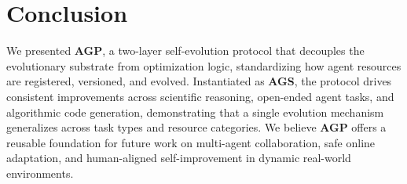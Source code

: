 \documentclass{article}
\theoremstyle{plain}
\theoremstyle{definition}
\theoremstyle{remark}
\newcommand{\projectname}{\textbf{\textsc{AGP}}\xspace}
\newcommand{\projectnameAgent}{\textbf{\textsc{AGS}}\xspace}
\begin{document}
\vspace{-0.2cm}
\section{Conclusion}
\vspace{-0.2cm}

We presented \projectname, a two-layer self-evolution protocol that decouples the evolutionary substrate from optimization logic, standardizing how agent resources are registered, versioned, and evolved. Instantiated as \projectnameAgent, the protocol drives consistent improvements across scientific reasoning, open-ended agent tasks, and algorithmic code generation, demonstrating that a single evolution mechanism generalizes across task types and resource categories. We believe \projectname offers a reusable foundation for future work on multi-agent collaboration, safe online adaptation, and human-aligned self-improvement in dynamic real-world environments.

\newpage




\newpage
\appendix


% 
\end{document}
